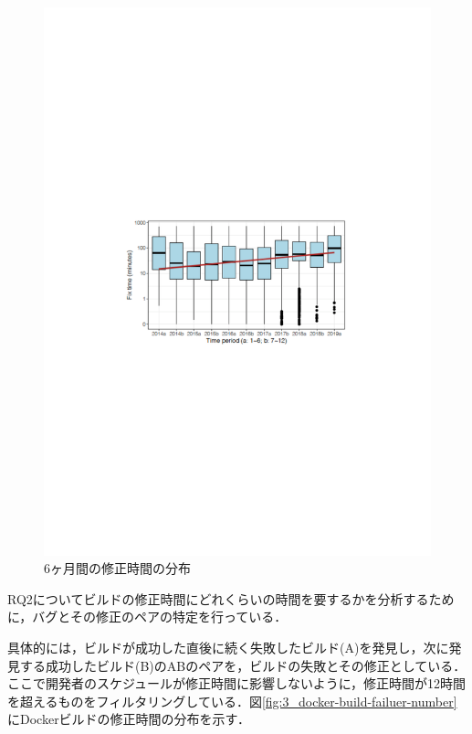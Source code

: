 \begin{figure}[t]
    \centering
    \includegraphics[width=0.9\linewidth, angle=0]{./thesis3/docker-build-fix-time-period3.pdf}
    \caption{6ヶ月間の修正時間の分布}
    \label{fig:3_docker-build-fix-time-period}
\end{figure}

RQ2についてビルドの修正時間にどれくらいの時間を要するかを分析するために，バグとその修正のペアの特定を行っている．


具体的には，ビルドが成功した直後に続く失敗したビルド(A)を発見し，次に発見する成功したビルド(B)のABのペアを，ビルドの失敗とその修正としている．ここで開発者のスケジュールが修正時間に影響しないように，修正時間が12時間を超えるものをフィルタリングしている．図\ref{fig:3_docker-build-failuer-number}にDockerビルドの修正時間の分布を示す．

